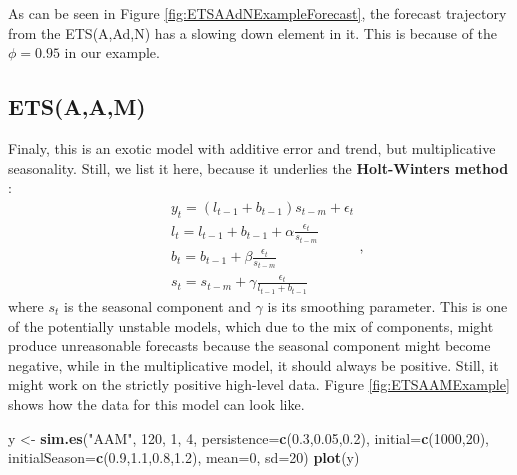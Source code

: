 \documentclass[]{book}
\newenvironment{Shaded}{\begin{snugshade}}{\end{snugshade}}
\newcommand{\DataTypeTok}[1]{\textcolor[rgb]{0.13,0.29,0.53}{#1}}
\newcommand{\DecValTok}[1]{\textcolor[rgb]{0.00,0.00,0.81}{#1}}
\newcommand{\FloatTok}[1]{\textcolor[rgb]{0.00,0.00,0.81}{#1}}
\newcommand{\KeywordTok}[1]{\textcolor[rgb]{0.13,0.29,0.53}{\textbf{#1}}}
\newcommand{\NormalTok}[1]{#1}
\newcommand{\StringTok}[1]{\textcolor[rgb]{0.31,0.60,0.02}{#1}}
\theoremstyle{definition}
\theoremstyle{definition}
\theoremstyle{definition}
\theoremstyle{definition}
\theoremstyle{remark}
\begin{document}
As can be seen in Figure \ref{fig:ETSAAdNExampleForecast}, the forecast trajectory from the ETS(A,Ad,N) has a slowing down element in it. This is because of the \(\phi=0.95\) in our example.

\hypertarget{ETSAAMModel}{%
\subsection{ETS(A,A,M)}\label{ETSAAMModel}}

Finaly, this is an exotic model with additive error and trend, but multiplicative seasonality. Still, we list it here, because it underlies the \textbf{Holt-Winters method} \citep{Winters1960}:
\begin{equation}
  \begin{aligned}
    & y_{t} = (l_{t-1} + b_{t-1}) s_{t-m} + \epsilon_t \\
    & l_t = l_{t-1} + b_{t-1} + \alpha \frac{\epsilon_t}{s_{t-m}} \\
    & b_t = b_{t-1} + \beta \frac{\epsilon_t}{s_{t-m}} \\
    & s_t = s_{t-m} + \gamma \frac{\epsilon_t}{l_{t-1}+b_{t-1}}
  \end{aligned} ,
  \label{eq:ETSAAM}
\end{equation}
where \(s_t\) is the seasonal component and \(\gamma\) is its smoothing parameter. This is one of the potentially unstable models, which due to the mix of components, might produce unreasonable forecasts because the seasonal component might become negative, while in the multiplicative model, it should always be positive. Still, it might work on the strictly positive high-level data. Figure \ref{fig:ETSAAMExample} shows how the data for this model can look like.

\begin{Shaded}
\begin{Highlighting}[]
\NormalTok{y <-}\StringTok{ }\KeywordTok{sim.es}\NormalTok{(}\StringTok{"AAM"}\NormalTok{, }\DecValTok{120}\NormalTok{, }\DecValTok{1}\NormalTok{, }\DecValTok{4}\NormalTok{, }\DataTypeTok{persistence=}\KeywordTok{c}\NormalTok{(}\FloatTok{0.3}\NormalTok{,}\FloatTok{0.05}\NormalTok{,}\FloatTok{0.2}\NormalTok{),}
            \DataTypeTok{initial=}\KeywordTok{c}\NormalTok{(}\DecValTok{1000}\NormalTok{,}\DecValTok{20}\NormalTok{), }\DataTypeTok{initialSeason=}\KeywordTok{c}\NormalTok{(}\FloatTok{0.9}\NormalTok{,}\FloatTok{1.1}\NormalTok{,}\FloatTok{0.8}\NormalTok{,}\FloatTok{1.2}\NormalTok{),}
            \DataTypeTok{mean=}\DecValTok{0}\NormalTok{, }\DataTypeTok{sd=}\DecValTok{20}\NormalTok{)}
\KeywordTok{plot}\NormalTok{(y)}
\end{Highlighting}
\end{Shaded}
\end{document}
